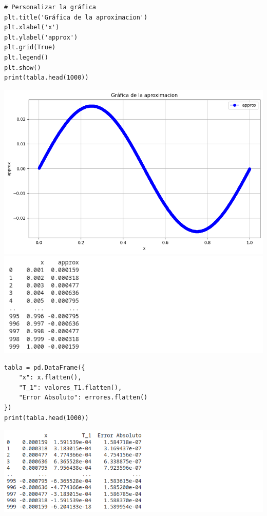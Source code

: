 \begin{homeworkProblem}
\begin{solucion}
\begin{enumerate}[a)]
\begin{lstlisting}
# Personalizar la gráfica
plt.title('Gráfica de la aproximacion')
plt.xlabel('x')
plt.ylabel('approx')
plt.grid(True)
plt.legend()
plt.show()
print(tabla.head(1000))  
          \end{lstlisting}
          \begin{center}
            \includegraphics[scale=0.6]{grafica_approx.png}\\
            \includegraphics[scale=1]{code8.png}
          \end{center}
          \begin{lstlisting}
tabla = pd.DataFrame({
    "x": x.flatten(),
    "T_1": valores_T1.flatten(),
    "Error Absoluto": errores.flatten()
})
print(tabla.head(1000))  
          \end{lstlisting}
          \begin{center}
            \includegraphics[scale=1]{code9.png}  

\end{center}
\end{enumerate}
\end{solucion}
\end{homeworkProblem}
